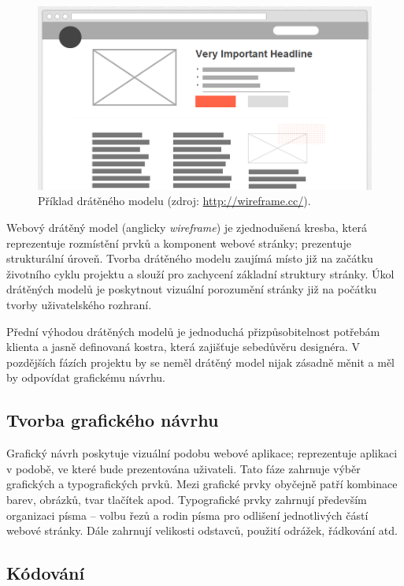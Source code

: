 \begin{figure}[htbp]
    \centering
    \includegraphics[width=\textwidth]{images/wireframe-example.png}
    \caption{Příklad drátěného modelu (zdroj: \url{http://wireframe.cc/}).}
\end{figure}

Webový drátěný model (anglicky \textit{wireframe}) je zjednodušená kresba, která reprezentuje rozmístění prvků a komponent webové stránky; prezentuje strukturální úroveň. Tvorba drátěného modelu zaujímá místo již na začátku životního cyklu projektu a slouží pro zachycení základní struktury stránky. Úkol drátěných modelů je poskytnout vizuální porozumění stránky již na počátku tvorby uživatelského rozhraní.

Přední výhodou drátěných modelů je jednoduchá přizpůsobitelnost potřebám klienta a jasně definovaná kostra, která zajišťuje sebedůvěru designéra. V pozdějších fázích projektu by se neměl drátěný model nijak zásadně měnit a měl by odpovídat grafickému návrhu.

\subsection{Tvorba grafického návrhu}
\label{sec:designing}

Grafický návrh poskytuje vizuální podobu webové aplikace; reprezentuje aplikaci v podobě, ve které bude prezentována uživateli. Tato fáze zahrnuje výběr grafických a typografických prvků. Mezi grafické prvky obyčejně patří kombinace barev, obrázků, tvar tlačítek apod. Typografické prvky zahrnují především organizaci písma -- volbu řezů a rodin písma pro odlišení jednotlivých částí webové stránky. Dále zahrnují velikosti odstavců, použití odrážek, řádkování atd.

\subsection{Kódování}
\label{sec:coding}

